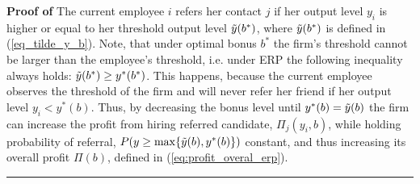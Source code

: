 \documentclass[12pt]{article}
\newenvironment{proof}[1][Proof of]{\noindent\textbf{#1} }{\ \rule{0.5em}{0.5em}}
\begin{document}
\begin{proof}
    The current employee $i$ refers her contact $j$ if her output level $y_i$ is higher or equal to her threshold output level $\Tilde{y}(b^*)$, where $\Tilde{y}(b^*)$ is defined in (\ref{eq_tilde_y_b}). Note, that under optimal bonus $b^*$ the firm's threshold cannot be larger than the employee's threshold, i.e. under ERP the following inequality always holds: $\Tilde{y}(b^*) \geq y^*(b^*)$. This happens, because the current employee observes the threshold of the firm and will never refer her friend if her output level $y_i < y^*(b)$. Thus, by decreasing the bonus level until $y^*(b) = \Tilde{y}(b)$ the firm can increase the profit from hiring referred candidate, $\Pi_j(y_i, b)$, while holding probability of referral, $P(y \geq \max \lbrace \Tilde{y}(b), y^*(b)\rbrace)$ constant, and thus increasing its overall profit $\Pi(b)$, defined in (\ref{eq:profit_overal_erp}).
\end{proof}
\end{document}
